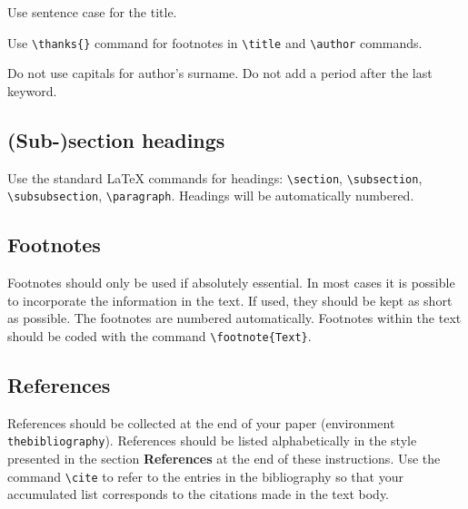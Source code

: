 \documentclass[bsi]{iosart2x}
\begin{document}
Use sentence case for the title.

Use \verb|\thanks{}| command for footnotes in \verb|\title|
and \verb|\author| commands.

Do not use capitals for author's surname.
Do not add a period after the last keyword.


\subsection{(Sub-)section headings}

Use the standard \LaTeX{} commands for headings: \verb|\section|, \verb|\subsection|, \verb|\subsubsection|, \verb|\paragraph|.
Headings will be automatically numbered.

\subsection{Footnotes}
Footnotes should only be used if absolutely essential.
In most cases it is possible to incorporate the information in the text.
If used, they should be kept as short as possible.
The footnotes are numbered automatically. Footnotes within the text should be coded with the command
\verb|\footnote{Text}|.


\subsection{References}

References should be collected at the end of your paper (environment
\verb|thebibliography|). References should be listed alphabetically in the style presented in the section \textbf{References} at the
end of these instructions. Use the command \verb|\cite| to refer to the entries in the bibliography so that your
accumulated list corresponds to the citations made in the text body.
\end{document}
